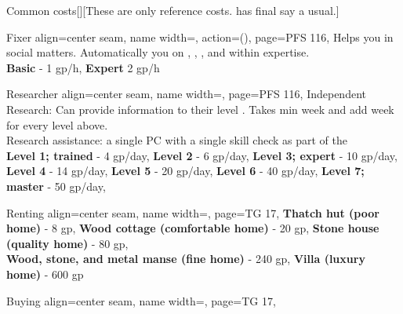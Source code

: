 \begin{PageBackLandscape}
\begin{TablesHalf}{\backTableHeight}
\begin{Table}{Common costs}[][These are only reference costs. \GM has final say a usual.]
\begin{entry}{Fixer }{%
                align=center seam,
                name width=\turnLength,%
                action={\BodyFont ()},
                page=PFS 116,
            }
                Helps you in social matters.\hfill
                Automatically  you on , , , and  within expertise.\\
                \textbf{Basic} - 1 gp/h, \quad
                \textbf{Expert}  2 gp/h 
            \end{entry}
            \begin{entry}{Researcher}{%
                align=center seam,
                name width=\turnLength,%
                page=PFS 116,
            }
                Independent Research: Can provide information to their level .\hfill
                Takes min  week and add  week for every level above.\\
                Research assistance:  a single PC with a single skill check as part of the \hfill
                \\
                \textbf{Level 1; trained} - 4 gp/day,\quad
                \textbf{Level 2} - 6 gp/day,\quad
                \textbf{Level 3; expert} - 10 gp/day, \hfill{}\\
                \textbf{Level 4} - 14 gp/day,\hspace{-0.73ex}\hphantom{; trained}\quad
                \textbf{Level 5} - 20 gp/day,\hspace{-0.73ex}\quad
                \textbf{Level 6} - 40 gp/day,\quad
                \textbf{Level 7; master} - 50 gp/day, \quad
            \end{entry}
            \breakLine[Housing]
            \begin{entry}{Renting}{%
                align=center seam,
                name width=\turnLength,%
                page=TG 17,
            }
                \textbf{Thatch hut (poor home)} - 8 gp, \hfill
                \textbf{Wood cottage (comfortable home)} - 20 gp, \hfill
                \textbf{Stone house (quality home)} - 80 gp,\\
                \textbf{Wood, stone, and metal manse (fine home)} - 240 gp, \quad
                \textbf{Villa (luxury home) } - 600 gp \hfill{}
            \end{entry}
            \begin{entry}{Buying}{%
                align=center seam,
                name width=\turnLength,%
                page=TG 17,
            }

\end{entry}
\end{Table}
\end{TablesHalf}
\end{PageBackLandscape}
